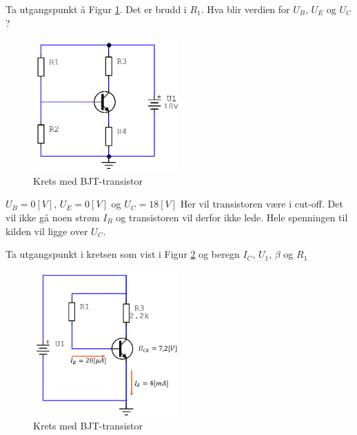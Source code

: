 \begin{question}[name=Oppgave, topic=transBJT]
Ta utgangspunkt å Figur \ref{fig:tranBJT7}. Det er brudd i $R_1$. Hva blir verdien for $U_B$, $U_E$ og $U_C$?

	\begin{figure}[H]
		\centering
		\includegraphics[width=0.5\textwidth]{transistor-BJT/figurer/krets7.png}
		\caption{Krets med BJT-transistor}
		\label{fig:tranBJT7}
	\end{figure}
	
\end{question}

\vspace{0.5cm} %

\begin{solution}[name=Løsningsforslag oppgave]
	$U_B=0[V]$, $U_E=0[V]$ og $U_C=18[V]$
	Her vil transistoren være i cut-off. Det vil ikke gå noen strøm $I_B$ og transistoren vil derfor ikke lede. Hele spenningen til kilden vil ligge over $U_C$.

\end{solution}




\begin{question}[name=Oppgave, topic=transBJT]
Ta utgangspunkt i kretsen som vist i Figur \ref{fig:tranBJT8} og beregn $I_C$, $U_1$, $\beta$ og $R_1$
	
	\begin{figure}[H]
		\centering
		\includegraphics[width=0.5\textwidth]{transistor-BJT/figurer/krets8.png}
		\caption{Krets med BJT-transistor}
		\label{fig:tranBJT8}
	\end{figure}
	
\end{question}

